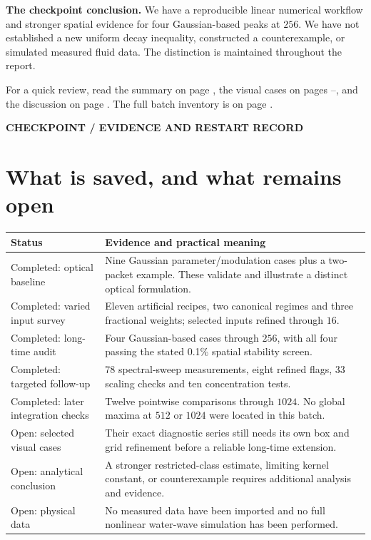\documentclass[10pt,letterpaper]{article}
\newcommand{\eyebrow}[1]{{\color{teal}\normalsize\bfseries #1}\par}
\newcommand{\callout}[1]{\par\smallskip\colorbox{pale}{\parbox{.96\linewidth}{\vspace{5pt}#1\vspace{5pt}}}\par\smallskip}
\begin{document}
\callout{\textbf{The checkpoint conclusion.} We have a reproducible linear
numerical workflow and stronger spatial evidence for four Gaussian-based peaks
at $256$. We have not established a new uniform decay inequality, constructed a
counterexample, or simulated measured fluid data. The distinction is maintained
throughout the report.}

For a quick review, read the summary on page \pageref{summary}, the visual cases
on pages \pageref{randomvolume}--\pageref{pairslice}, and the discussion on page
\pageref{discussion}. The full batch inventory is on page \pageref{guide}.

\newpage
{}\label{restart}
\eyebrow{CHECKPOINT / EVIDENCE AND RESTART RECORD}
\section*{What is saved, and what remains open}
\begin{center}\begin{tabular}{p{.27\linewidth}p{.64\linewidth}}\toprule
Status & Evidence and practical meaning\\\midrule
Completed: optical baseline & Nine Gaussian parameter/modulation cases plus a
two-packet example. These validate and illustrate a distinct optical formulation.\\
Completed: varied input survey & Eleven artificial recipes, two canonical regimes
and three fractional weights; selected inputs refined through $16$.\\
Completed: long-time audit & Four Gaussian-based cases through $256$, with all
four passing the stated 0.1\% spatial stability screen.\\
Completed: targeted follow-up & 78 spectral-sweep measurements, eight refined flags,
33 scaling checks and ten concentration tests.\\
Completed: later integration checks & Twelve pointwise comparisons through $1024$.
No global maxima at $512$ or $1024$ were located in this batch.\\
Open: selected visual cases & Their exact diagnostic series still needs its own
box and grid refinement before a reliable long-time extension.\\
Open: analytical conclusion & A stronger restricted-class estimate, limiting kernel
constant, or counterexample requires additional analysis and evidence.\\
Open: physical data & No measured data have been imported and no full nonlinear
water-wave simulation has been performed.\\\bottomrule
\end{tabular}\end{center}
\end{document}
